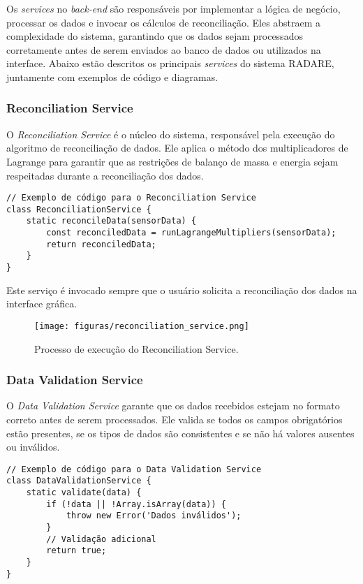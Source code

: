 Os \textit{services} no \textit{back-end} são responsáveis por implementar a lógica de negócio, processar os dados e invocar os cálculos de reconciliação. Eles abstraem a complexidade do sistema, garantindo que os dados sejam processados corretamente antes de serem enviados ao banco de dados ou utilizados na interface. Abaixo estão descritos os principais \textit{services} do sistema RADARE, juntamente com exemplos de código e diagramas.

\subsubsection{Reconciliation Service}

O \textit{Reconciliation Service} é o núcleo do sistema, responsável pela execução do algoritmo de reconciliação de dados. Ele aplica o método dos multiplicadores de Lagrange para garantir que as restrições de balanço de massa e energia sejam respeitadas durante a reconciliação dos dados.

\begin{verbatim}
// Exemplo de código para o Reconciliation Service
class ReconciliationService {
    static reconcileData(sensorData) {
        const reconciledData = runLagrangeMultipliers(sensorData);
        return reconciledData;
    }
}
\end{verbatim}

Este serviço é invocado sempre que o usuário solicita a reconciliação dos dados na interface gráfica.

\begin{figure}[htbp]
    \centering
    \texttt{[image: figuras/reconciliation\_service.png]}
    \caption{Processo de execução do Reconciliation Service.}
    \label{Fig:ReconciliationService}
\end{figure}

\subsubsection{Data Validation Service}

O \textit{Data Validation Service} garante que os dados recebidos estejam no formato correto antes de serem processados. Ele valida se todos os campos obrigatórios estão presentes, se os tipos de dados são consistentes e se não há valores ausentes ou inválidos.

\begin{verbatim}
// Exemplo de código para o Data Validation Service
class DataValidationService {
    static validate(data) {
        if (!data || !Array.isArray(data)) {
            throw new Error('Dados inválidos');
        }
        // Validação adicional
        return true;
    }
}
\end{verbatim}

